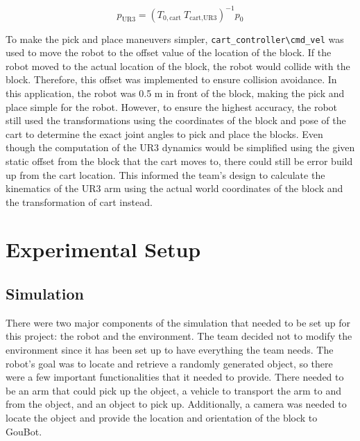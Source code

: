         \begin{equation}
            \label{eqn:transform}
            p_{\text{UR3}} = (T_{0,\text{cart}}~T_{\text{cart},\text{UR3}} )^{-1}p_0
        \end{equation}
        
        To make the pick and place maneuvers simpler, \lstinline!cart_controller\cmd_vel! was used to move the robot to the offset value of the location of the block. If the robot moved to the actual location of the block, the robot would collide with the block. Therefore, this offset was implemented to ensure collision avoidance. In this application, the robot was 0.5 m in front of the block, making the pick and place simple for the robot. However, to ensure the highest accuracy, the robot still used the transformations using the coordinates of the block and pose of the cart to determine the exact joint angles to pick and place the blocks. Even though the computation of the UR3 dynamics would be simplified using the given static offset from the block that the cart moves to, there could still be error build up from the cart location. This informed the team's design to calculate the kinematics of the UR3 arm using the actual world coordinates of the block and the transformation of cart instead. 

\newpage
\section{Experimental Setup} \label{sec:experimental_setup}
    
    
    \subsection{Simulation}
    
        There were two major components of the simulation that needed to be set up for this project: the robot and the environment. The team decided not to modify the environment since it has been set up to have everything the team needs. The robot's goal was to locate and retrieve a randomly generated object, so there were a few important functionalities that it needed to provide. There needed to be an arm that could pick up the object, a vehicle to transport the arm to and from the object, and an object to pick up. Additionally, a camera was needed to locate the object and provide the location and orientation of the block to GouBot.
    
